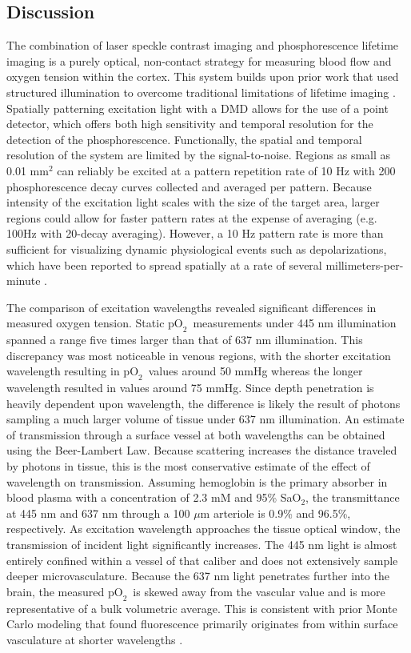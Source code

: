 \documentclass[12pt]{spieman}  %
\newcommand{\pO}{\ensuremath{\text{pO}_2}} 	            %
\begin{document}
\begin{spacing}{2}
\section{Discussion}
\label{sect:discussion}

The combination of laser speckle contrast imaging and phosphorescence lifetime imaging is a purely optical, non-contact strategy for measuring blood flow and oxygen tension within the cortex. This system builds upon prior work that used structured illumination to overcome traditional limitations of lifetime imaging \cite{Ponticorvo:2010uv}. Spatially patterning excitation light with a DMD allows for the use of a point detector, which offers both high sensitivity and temporal resolution for the detection of the phosphorescence. Functionally, the spatial and temporal resolution of the system are limited by the signal-to-noise. Regions as small as 0.01 mm$^{2}$ can reliably be excited at a pattern repetition rate of 10 Hz with 200 phosphorescence decay curves collected and averaged per pattern. Because intensity of the excitation light scales with the size of the target area, larger regions could allow for faster pattern rates at the expense of averaging (e.g. 100Hz with 20-decay averaging). However, a 10 Hz pattern rate is more than sufficient for visualizing dynamic physiological events such as depolarizations, which have been reported to spread spatially at a rate of several millimeters-per-minute \cite{Lauritzen:1994vs}.

The comparison of excitation wavelengths revealed significant differences in measured oxygen tension. Static \pO\ measurements under 445 nm illumination spanned a range five times larger than that of 637 nm illumination. This discrepancy was most noticeable in venous regions, with the shorter excitation wavelength resulting in \pO\ values around 50 mmHg whereas the longer wavelength resulted in values around 75 mmHg. Since depth penetration is heavily dependent upon wavelength\cite{Deng:2003kb}, the difference is likely the result of photons sampling a much larger volume of tissue under 637 nm illumination. An estimate of transmission through a surface vessel at both wavelengths can be obtained using the Beer-Lambert Law. Because scattering increases the distance traveled by photons in tissue, this is the most conservative estimate of the effect of wavelength on transmission. Assuming hemoglobin is the primary absorber in blood plasma with a concentration of 2.3 mM \cite{Robles:2010cw} and 95\% SaO$_{2}$, the transmittance at 445 nm and 637 nm through a 100 $\mu$m arteriole is 0.9\% and 96.5\%, respectively. As excitation wavelength approaches the tissue optical window, the transmission of incident light significantly increases. The 445 nm light is almost entirely confined within a vessel of that caliber and does not extensively sample deeper microvasculature. Because the 637 nm light penetrates further into the brain, the measured \pO\ is skewed away from the vascular value and is more representative of a bulk volumetric average. This is consistent with prior Monte Carlo modeling that found fluorescence primarily originates from within surface vasculature at shorter wavelengths \cite{Davis:2011wj}.


\end{spacing}
\end{document}
